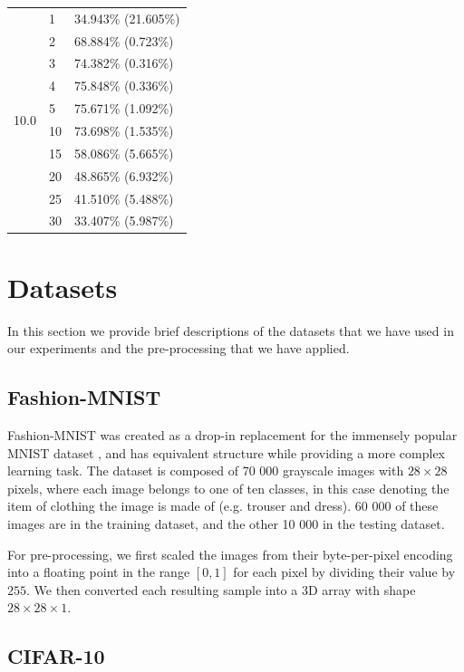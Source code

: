 \documentclass[conference,compsoc]{IEEEtran}
\begin{document}
\begin{table}[ht]
\begin{tabular}{lll}
    \hline
    \multirow{10}{*}{10.0} & 1 & 34.943\% (21.605\%) \\
    & 2 & 68.884\% (0.723\%) \\
    & 3 & 74.382\% (0.316\%) \\
    & 4 & 75.848\% (0.336\%) \\
    & 5 & 75.671\% (1.092\%) \\
    & 10 & 73.698\% (1.535\%) \\
    & 15 & 58.086\% (5.665\%) \\
    & 20 & 48.865\% (6.932\%) \\
    & 25 & 41.510\% (5.488\%) \\
    & 30 & 33.407\% (5.987\%) \\
    \hline
    \end{tabular}
\end{table}


\section{Datasets}

In this section we provide brief descriptions of the datasets that we have used in our experiments and the pre-processing that we have applied.

\subsection{Fashion-MNIST}

Fashion-MNIST \cite{xiao2017fashion} was created as a drop-in replacement for the immensely popular MNIST dataset \cite{lecun1998gradient}, and has equivalent structure while providing a more complex learning task. The dataset is composed of 70 000 grayscale images with $28 \times 28$ pixels, where each image belongs to one of ten classes, in this case denoting the item of clothing the image is made of (e.g. trouser and dress). 60 000 of these images are in the training dataset, and the other 10 000 in the testing dataset.

\noindent For pre-processing, we first scaled the images from their byte-per-pixel encoding into a floating point in the range $[0, 1]$ for each pixel by dividing their value by $255$. We then converted each resulting sample into a 3D array with shape $28 \times 28 \times 1$.

\subsection{CIFAR-10}
\end{document}
